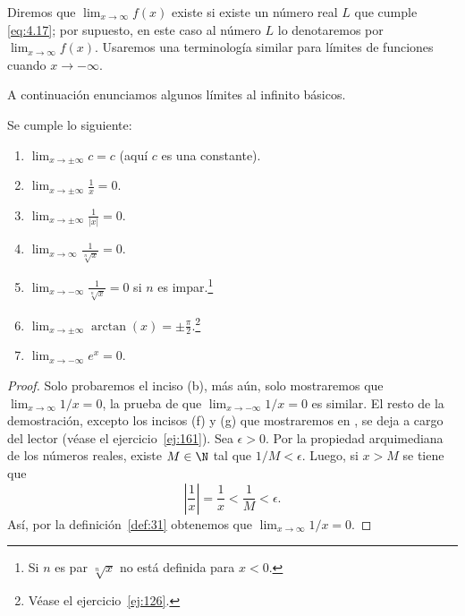 \documentclass[12pt,a4paper]{book}
\begin{document}
    Diremos que $\lim_{x\to\infty}f(x)$ existe si existe un número real $L$ que cumple
    \eqref{eq:4.17}; por supuesto, en este caso al número $L$ lo denotaremos por
    $\lim_{x\to\infty}f(x)$. Usaremos una terminología similar para límites de funciones
    cuando $x\to-\infty$.

    A continuación enunciamos algunos límites al infinito básicos.

    \begin{proposicion}\label{prop:44}
        Se cumple lo siguiente:
        \begin{enumerate}[nosep]
            \item $\displaystyle\lim_{x\to\pm\infty}c=c$ (aquí $c$ es una constante).
            \item $\displaystyle\lim_{x\to\pm\infty}\frac{1}{x}=0$.
            \item $\displaystyle\lim_{x\to\pm\infty}\frac{1}{|x|}=0$.
            \item $\displaystyle\lim_{x\to\infty}\frac{1}{\sqrt[n]{x}}=0$.
            \item $\displaystyle\lim_{x\to-\infty}\frac{1}{\sqrt[n]{x}}=0$ si $n$ es impar.\footnote{Si $n$ es par $\sqrt[n]{x}$ no está definida para $x<0$.}
            \item $\displaystyle\lim_{x\to\pm\infty}\arctan(x)=\pm\frac{\pi}{2}$.\footnote{Véase el ejercicio~\ref{ej:126}.}
            \item $\displaystyle\lim_{x\to-\infty}e^{x}=0$.
        \end{enumerate}
    \end{proposicion}

    \begin{proof}
        Solo probaremos el inciso (b), más aún, solo mostraremos
        que $\lim_{x\to\infty}1/x=0$, la prueba de que $\lim_{x\to-\infty}1/x=0$ es similar. El resto
        de la demostración, excepto los incisos (f) y (g) que mostraremos en \cite{nunez2020calculoII}, se
        deja a cargo del lector (véase el ejercicio~\ref{ej:161}). Sea $\epsilon>0$. Por la propiedad
        arquimediana de los números reales, existe $M\in\N$ tal que $1/M<\epsilon$. Luego,
        si $x>M$ se tiene que
        \begin{equation*}
            \left|\frac{1}{x}\right|=\frac{1}{x}<\frac{1}{M}<\epsilon.
        \end{equation*}
        Así, por la definición~\ref{def:31} obtenemos que $\lim_{x\to\infty}1/x=0$.
    \end{proof}
\end{document}
